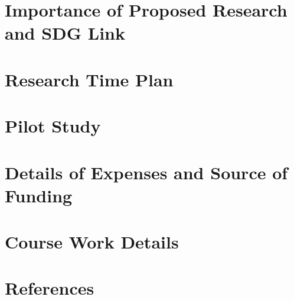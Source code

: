 \documentclass[12pt,a4paper]{report}
\begin{document}
\chapter{Importance of Proposed Research and SDG Link}

\chapter{Research Time Plan}

\chapter{Pilot Study}

\chapter{Details of Expenses and Source of Funding}

\chapter{Course Work Details}

\chapter{References}
\end{document}
